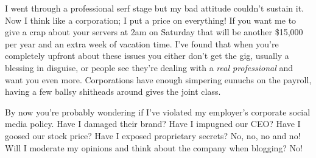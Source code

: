 I went through a professional serf stage but my bad attitude couldn't
sustain it. Now I think like a corporation; I put a price on everything!
If you want me to give a crap about your servers at 2am on Saturday that
will be another \$15,000 per year and an extra week of vacation time.
I've found that when you're completely upfront about these issues you
either don't get the gig, usually a blessing in disguise, or people see
they're dealing with a \emph{real professional} and want you even more.
Corporations have enough simpering eunuchs on the payroll, having a few
ballsy shitheads around gives the joint class.

By now you're probably wondering if I've violated my employer's
corporate social media policy. Have I damaged their brand? Have I
impugned our CEO? Have I goosed our stock price? Have I exposed
proprietary secrets? No, no, no and no! Will I moderate my opinions and
think about the company when blogging? No!



%